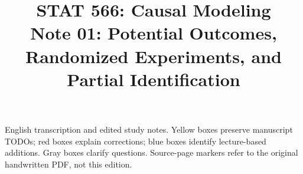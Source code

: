 
\title{STAT 566: Causal Modeling\\[.4em]\large Note 01: Potential Outcomes, Randomized Experiments, and Partial Identification}

\maketitle
\begin{remarkbox}
English transcription and edited study notes. Yellow boxes preserve manuscript TODOs; red boxes explain corrections; blue boxes identify lecture-based additions. Gray boxes clarify questions. Source-page markers refer to the original handwritten PDF, not this edition.
\end{remarkbox}
\tableofcontents
\clearpage


